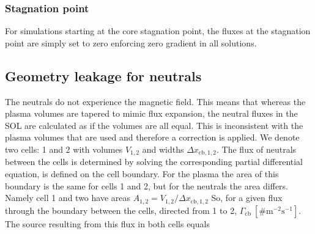\documentclass[amsmath,amssymb,a4]{revtex4-2}
\begin{document}
\subsubsection{Stagnation point}
For simulations starting at the core stagnation point, the fluxes at the stagnation point are simply set to zero enforcing zero gradient in all solutions. 

\subsection{Geometry leakage for neutrals}
The neutrals do not experience the magnetic field. This means that whereas the plasma volumes are tapered to mimic flux expansion, the neutral fluxes in the SOL are calculated as if the volumes are all equal. This is inconsistent with the plasma volumes that are used and therefore a correction is applied. We denote two cells: 1 and 2 with volumes $V_{ \mathrm{1,2}}$ and widths $\Delta x_{ \mathrm{cb,1,2}}$. The flux of neutrals between the cells is determined by solving the corresponding partial differential equation, is defined on the cell boundary. For the plasma the area of this boundary is the same for cells 1 and 2, but for the neutrals the area differs. Namely cell 1 and two have areas $A_{1,2}= V_{ \mathrm{1,2}}/\Delta x_{ \mathrm{cb,1,2}}$ 
So, for a given flux through the boundary between the cells, directed from 1 to 2, $\Gamma_{\mathrm{cb}} ~ \mathrm{[\# m^{-2} s^{-1}]}$. The source resulting from this flux in both cells equals
\end{document}
